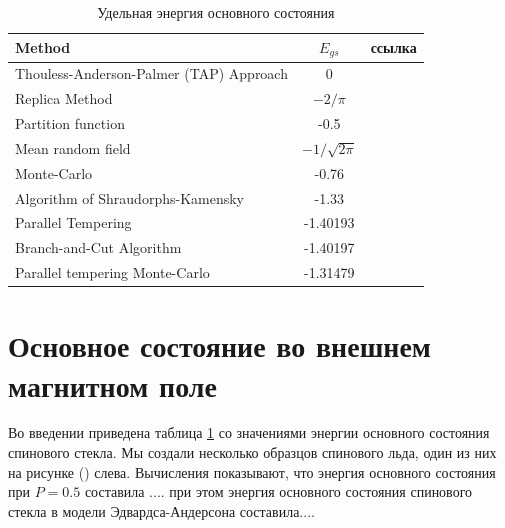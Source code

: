 \documentclass[utf8, babel, sor, jor, amsmath, amssymb, reprint]{elsarticle} %
\begin{document}
\begin{table}[!h]
	\begin{tabular}{|l|c|l|}
		\hline
		Method                                   & $E_{gs}$                                       & ссылка                                          \\ \hline
		Thouless-Anderson-Palmer (TAP) Approach & 0                                              & \cite{thouless1977solution}    \\ \hline
		Replica Method                            & $-2/\pi$                                       & \cite{sherrington1975solvable} \\ \hline
		Partition function                      & -0.5                                           & \cite{tanaka1980analytic}      \\ \hline
		Mean random field                       & $-1/\sqrt{2\pi}$                               & \cite{klein1976comparison}     \\ \hline
		Monte-Carlo                             & -0.76                                          & \cite{kirkpatrick1978infinite} \\ \hline
		Algorithm of Shraudorphs-Kamensky        & -1.33                                          & \cite{karandashev2019global}   \\ \hline
		Parallel Tempering   & -1.40193                                       & \cite{palmer1999ground}        \\ \hline
		Branch-and-Cut Algorithm              & -1.40197                         
		& \cite{campbell2004energy}      \\ \hline
		
		Parallel tempering Monte-Carlo  & -1.31479                                       & \cite{roma2009ground}          \\ \hline
		
		
		
	\end{tabular}
	\label{tab:Egs}
	\caption{Удельная энергия основного состояния}
\end{table}


\section{Основное состояние во внешнем магнитном поле}


Во введении приведена таблица \ref{tab:Egs} со значениями энергии основного состояния спинового стекла. Мы создали несколько образцов спинового льда, один из них на рисунке (\label{fig:cell_SI_SG}) слева. Вычисления показывают, что энергия основного состояния при $P=0.5$ составила .... при этом энергия основного состояния спинового стекла в модели Эдвардса-Андерсона составила....
\end{document}
